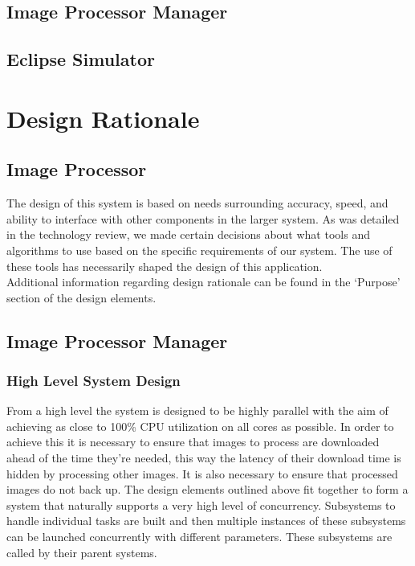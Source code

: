 \documentclass[10pt, onecolumn, draftclsnofoot, letterpaper, compsoc]{IEEEtran}
\begin{document}
\subsection{Image Processor Manager}

\subsection{Eclipse Simulator}


\section{Design Rationale}

\subsection{Image Processor}

The design of this system is based on needs surrounding accuracy, speed, and
ability to interface with other components in the larger system. As was detailed
in the technology review, we made certain decisions about what tools and
algorithms to use based on the specific requirements of our system. The use of
these tools has necessarily shaped the design of this application.\\

Additional information regarding design rationale can be found in the `Purpose'\\
section of the design elements.

\subsection{Image Processor Manager}

    \subsubsection{High Level System Design}
    From a high level the system is designed to be highly parallel with the aim of achieving as close to 
    100\% CPU utilization on all cores as possible. In order to achieve this it is necessary to ensure that 
    images to process are downloaded ahead of the time they're needed, this way the latency of their download 
    time is hidden by processing other images. It is also necessary to ensure that processed images do not back 
    up. The design elements outlined above fit together to form a system that naturally supports a very high 
    level of concurrency. Subsystems to handle individual tasks are built and then multiple instances of these 
    subsystems can be launched concurrently with different parameters. These subsystems are called by their 
    parent systems. \\
\end{document}
